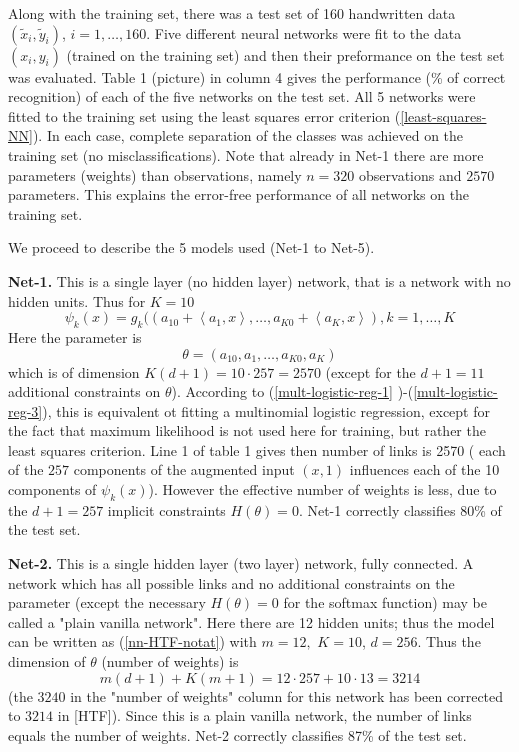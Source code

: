 \documentclass[11pt,twoside]{article}%
\theoremstyle{change}
\begin{document}
Along with the training set, there was a test set of 160 handwritten data
$(\tilde{x}_{i},\tilde{y}_{i})$, $i=1,\ldots,160$. Five different neural
networks were fit to the data $(x_{i},y_{i})$ (trained on the training set)
and then their preformance on the test set was evaluated. Table 1 (picture) in
column 4 gives the performance (\% of correct recognition) of each of the five
networks on the test set. All 5 networks were fitted to the training set using
the least squares error criterion (\ref{least-squares-NN}). In each case,
complete separation of the classes was achieved on the training set (no
misclassifications). Note that already in Net-1 there are more parameters
(weights) than observations, namely $n=320$ observations and $2570 $
parameters. This explains the error-free performance of all networks on the
training set.

We proceed to describe the 5 models used (Net-1 to Net-5).

\bigskip

\textbf{Net-1.} This is a single layer (no hidden layer) network, that is a
network with no hidden units. Thus for $K=10$
\[
\psi_{k}(x)=g_{k}((a_{10}+\left\langle a_{1},x\right\rangle ,\ldots
,a_{K0}+\left\langle a_{K},x\right\rangle ),k=1,\ldots,K
\]
Here the parameter is
\[
\theta=\left(  a_{10},a_{1},\ldots,a_{K0},a_{K}\right)
\]
which is of dimension $K(d+1)=10\cdot257=2570$ (except for the $d+1=11$
additional constraints on $\theta$). According to (\ref{mult-logistic-reg-1}%
)-(\ref{mult-logistic-reg-3}), this is equivalent ot fitting a multinomial
logistic regression, except for the fact that maximum likelihood is not used
here for training, but rather the least squares criterion. Line 1 of table 1
gives then number of links is 2570 ( each of the $257$ components of the
augmented input $(x,1)$ influences each of the 10 components of $\psi_{k}(x)
$). However the effective number of weights is less, due to the $d+1=257$
implicit constraints $H(\theta)=0$. Net-1 correctly classifies 80\% of the
test set.

\bigskip

\textbf{Net-2.} This is a single hidden layer (two layer) network, fully
connected. A network which has all possible links and no additional
constraints on the parameter (except the necessary $H(\theta)=0$ for the
softmax function) may be called a "plain vanilla network". Here there are 12
hidden units; thus the model can be written as (\ref{nn-HTF-notat}) with
$m=12,$ $K=10$, $d=256$. Thus the dimension of $\theta$ (number of weights)
is
\[
m(d+1)+K(m+1)=12\cdot257+10\cdot13=3214
\]
(the $3240$ in the "number of weights" column for this network has been
corrected to $3214$ in [HTF]). Since this is a plain vanilla network, the
number of links equals the number of weights. Net-2 correctly classifies 87\%
of the test set.
\end{document}
